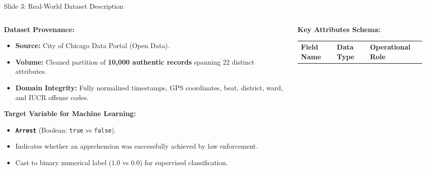 \documentclass[aspectratio=169]{beamer}
\begin{document}
\begin{frame}{Slide 3: Real-World Dataset Description}
    \begin{columns}[T]
        \begin{column}{0.48\textwidth}
            \textbf{\textcolor{NavyBlue}{Dataset Provenance:}}
            \vspace{0.05cm}
            \begin{itemize}\footnotesize
                \setlength{\itemsep}{2pt}
                \item \textbf{Source:} City of Chicago Data Portal (Open Data).
                \item \textbf{Volume:} Cleaned partition of \textbf{10,000 authentic records} spanning 22 distinct attributes.
                \item \textbf{Domain Integrity:} Fully normalized timestamps, GPS coordinates, beat, district, ward, and IUCR offense codes.
            \end{itemize}
            \vspace{0.08cm}
            \textbf{\textcolor{NavyBlue}{Target Variable for Machine Learning:}}
            \vspace{0.04cm}
            \begin{itemize}\footnotesize
                \item \textbf{\texttt{Arrest}} (Boolean: \texttt{true} vs \texttt{false}).
                \item Indicates whether an apprehension was successfully achieved by law enforcement.
                \item Cast to binary numerical label ($1.0$ vs $0.0$) for supervised classification.
            \end{itemize}
        \end{column}
        \begin{column}{0.48\textwidth}
            \textbf{\textcolor{NavyBlue}{Key Attributes Schema:}}
            \vspace{0.05cm}
            {\fontsize{6.2}{7.5}\selectfont
            \begin{table}
                \centering
                \renewcommand{\arraystretch}{1.15}
                \begin{tabular}{llp{3.2cm}}
                    \toprule
                    \textbf{Field Name} & \textbf{Data Type} & \textbf{Operational Role} \\

\end{tabular}
\end{table}}
\end{column}
\end{columns}
\end{frame}
\end{document}
